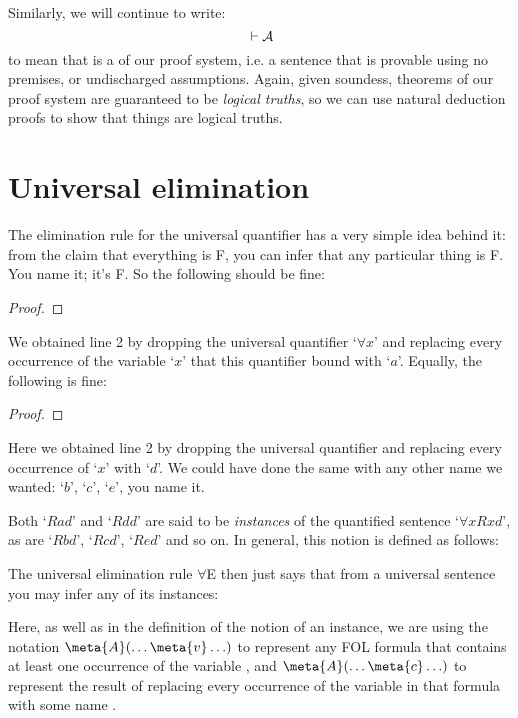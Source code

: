 Similarly, we will continue to write:
$${} \vdash \mathcal{A}$$
to mean that  is a  of our proof system, i.e. a sentence that is provable using no premises, or undischarged assumptions.  Again, given soundess, theorems of our proof system are guaranteed to be \emph{logical truths}, so we can use natural deduction proofs to show that things are logical truths.



\section{Universal elimination}\label{s:UniversalElim}


The elimination rule for the universal quantifier has a very simple idea behind it: from the claim that everything is F, you can infer that any particular thing is F. You name it; it's F. So the following should be fine:
\begin{proof}
	 
\end{proof}
We obtained line 2 by dropping the universal quantifier `$\forall x$' and replacing every occurrence of the variable `$x$' that this quantifier bound with `$a$'. Equally, the following is fine:
\begin{proof}
	 
\end{proof}
Here we obtained line 2 by dropping the universal quantifier and replacing every occurrence of `$x$' with `$d$'. We could have done the same with any other name we wanted: `$b$', `$c$', `$e$', you name it.

Both `$Rad$' and `$Rdd$' are said to be \emph{instances} of the quantified sentence `$\forall xRxd$', as are `$Rbd$', `$Rcd$', `$Red$' and so on.  In general, this notion is defined as follows:

The universal elimination rule $\forall$E then just says that from a universal sentence you may infer any of its instances:

Here, as well as in the definition of the notion of an instance, we are using the notation $\meta{A}(\ldots \meta{v} \ldots)$ to represent any FOL formula  that contains at least one occurrence of the variable , and $\meta{A}(\ldots \meta{c} \ldots)$ to represent the result of replacing every occurrence of the variable  in that formula with some name .  

